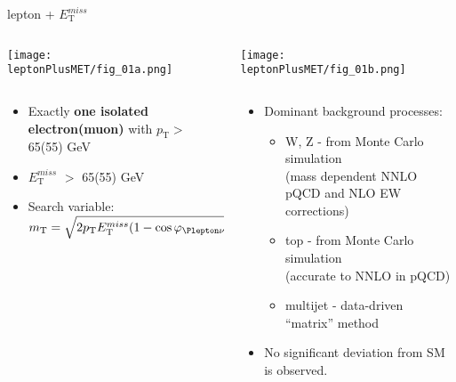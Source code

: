 \documentclass[8pt]{beamer}
\begin{document}
\begin{frame}{\large lepton + $E_\mathrm{T}^{miss}$}
  
  \begin{columns}
   \begin{column}{6cm}
    \texttt{[image: leptonPlusMET/fig\_01a.png]}\\
   \end{column}
   \begin{column}{6cm}
    \texttt{[image: leptonPlusMET/fig\_01b.png]}\\
   \end{column}
  \end{columns}
  \begin{columns}
   \begin{column}{6cm}
    \begin{itemize}
     \item Exactly \textbf{one isolated electron(muon)} with $p_\mathrm{T}>$ 65(55) GeV
     \item \textbf{$E_\mathrm{T}^{miss}$} $>$ 65(55) GeV
     \item Search variable: \\ $m_\mathrm{T} = \sqrt{2 p_\mathrm{T} E_\mathrm{T}^{miss} (1-\cos\varphi_{\Plepton\nu})}$
    \end{itemize}
   \end{column}
   \begin{column}{6cm}
    \begin{itemize}
     \item Dominant background processes:
     \begin{itemize}
       \item W, Z - from Monte Carlo simulation\\ {\scriptsize (mass dependent NNLO pQCD and NLO EW corrections)}
       \item top - from Monte Carlo simulation\\ {\scriptsize (accurate to NNLO in pQCD)}
       \item multijet - data-driven “matrix” method
     \end{itemize}
     \item No significant deviation from SM is observed.
    \end{itemize}
   
   \end{column}
  \end{columns}

  
 \end{frame}
\end{document}
